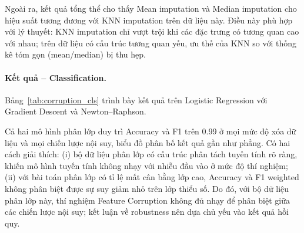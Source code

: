 Ngoài ra, kết quả tổng thể cho thấy Mean imputation và Median imputation
cho hiệu suất tương đương với KNN imputation trên dữ liệu này.
Điều này phù hợp với lý thuyết: KNN imputation chỉ vượt trội khi
các đặc trưng có tương quan cao với nhau;
trên dữ liệu có cấu trúc tương quan yếu,
ưu thế của KNN so với thống kê tóm gọn (mean/median) bị thu hẹp.

\paragraph{Kết quả – Classification.}
Bảng~\ref{tab:corruption_cls} trình bày kết quả trên Logistic Regression
với Gradient Descent và Newton--Raphson.

\begin{table}[h]
\centering
\caption{Accuracy và F1-score theo chiến lược nội suy và mức độ xóa dữ liệu (Classification).}
\label{tab:corruption_cls}
\end{table}

Cả hai mô hình phân lớp duy trì Accuracy và F1 trên 0.99
ở mọi mức độ xóa dữ liệu và mọi chiến lược nội suy,
biểu đồ phân bố kết quả gần như phẳng.
Có hai cách giải thích:
(i) bộ dữ liệu phân lớp có cấu trúc phân tách tuyến tính rõ ràng,
khiến mô hình tuyến tính không nhạy với nhiễu đầu vào ở mức độ thí nghiệm;
(ii) với bài toán phân lớp có tỉ lệ mất cân bằng lớp cao,
Accuracy và F1 weighted không phân biệt được sự suy giảm nhỏ trên lớp thiểu số.
Do đó, với bộ dữ liệu phân lớp này, thí nghiệm Feature Corruption
không đủ nhạy để phân biệt giữa các chiến lược nội suy;
kết luận về robustness nên dựa chủ yếu vào kết quả hồi quy.

